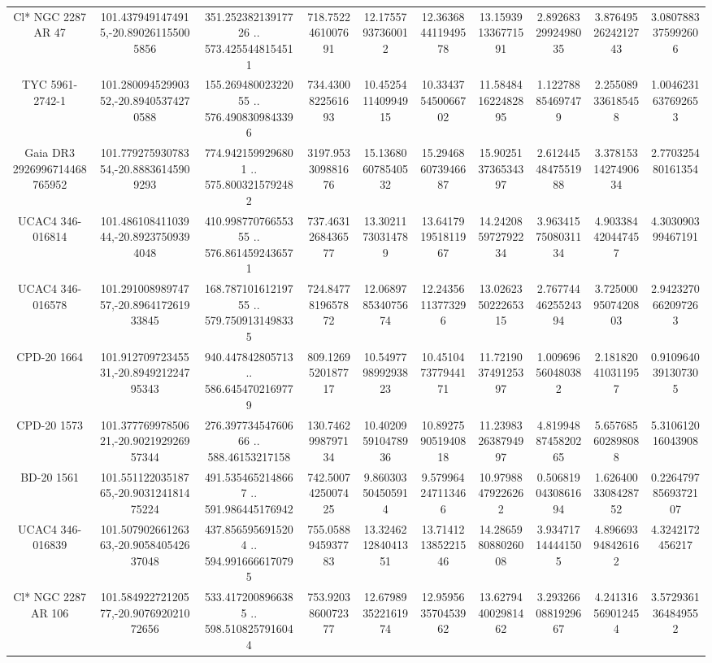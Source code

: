 \begin{table}
\begin{tabular}{cccccccccc}
Cl* NGC 2287     AR      47 & 101.4379491474915,-20.890261155005856 & 351.25238213917726 .. 573.4255448154511 & 718.7522461007691 & 12.17557937360012 & 12.363684411949578 & 13.159391336771591 & 2.8926832992498035 & 3.8764952624212743 & 3.0807883375992606 \\
TYC 5961-2742-1 & 101.28009452990352,-20.89405374270588 & 155.26948002322055 .. 576.4908309843396 & 734.4300822561693 & 10.452541140994915 & 10.334375450066702 & 11.584841622482895 & 1.122788854697479 & 2.255089336185458 & 1.0046231637692653 \\
Gaia DR3 2926996714468765952 & 101.77927593078354,-20.88836145909293 & 774.9421599296801 .. 575.8003215792482 & 3197.953309881676 & 15.136806078540532 & 15.294686073946687 & 15.902513736534397 & 2.6124454847551988 & 3.3781531427490634 & 2.770325480161354 \\
UCAC4 346-016814 & 101.48610841103944,-20.89237509394048 & 410.99877076655355 .. 576.8614592436571 & 737.4631268436577 & 13.30211730314789 & 13.641791951811967 & 14.242085972792234 & 3.9634157508031134 & 4.903384420447457 & 4.303090399467191 \\
UCAC4 346-016578 & 101.29100898974757,-20.896417261933845 & 168.78710161219755 .. 579.7509131498335 & 724.8477819657872 & 12.068978534075674 & 12.24356113773296 & 13.026235022265315 & 2.7677444625524394 & 3.7250009507420803 & 2.9423270662097263 \\
CPD-20  1664 & 101.91270972345531,-20.894921224795343 & 940.447842805713 .. 586.6454702169779 & 809.1269520187717 & 10.549779899293823 & 10.451047377944171 & 11.721903749125397 & 1.009696560480382 & 2.181820410311957 & 0.9109640391307305 \\
CPD-20  1573 & 101.37776997850621,-20.902192926957344 & 276.39773454760666 .. 588.46153217158 & 130.7462998797134 & 10.402095910478936 & 10.892759051940818 & 11.239832638794997 & 4.8199488745820265 & 5.657685602898088 & 5.310612016043908 \\
BD-20  1561 & 101.55112203518765,-20.903124181475224 & 491.5354652148667 .. 591.986445176942 & 742.5007425007425 & 9.860303504505914 & 9.579964247113466 & 10.97988479226262 & 0.5068190430861694 & 1.6264003308428752 & 0.22647978569372107 \\
UCAC4 346-016839 & 101.50790266126363,-20.905840542637048 & 437.8565956915204 .. 594.9916666170795 & 755.0588945937783 & 13.324621284041351 & 13.714121385221546 & 14.286598088026008 & 3.934717144441505 & 4.896693948426162 & 4.3242172456217 \\
Cl* NGC 2287     AR     106 & 101.58492272120577,-20.907692021072656 & 533.4172008966385 .. 598.5108257916044 & 753.9203860072377 & 12.679893522161974 & 12.959563570453962 & 13.627944002981462 & 3.2932660881929667 & 4.241316569012454 & 3.5729361364849552 \\

\end{tabular}
\end{table}
